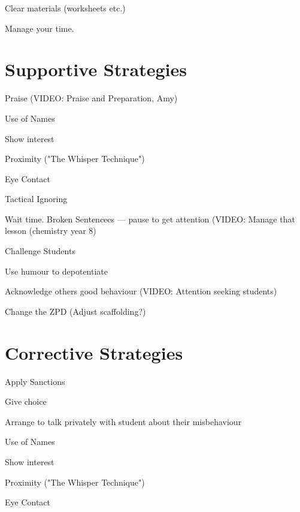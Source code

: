 \documentclass{report}
\begin{document}
Clear materials (worksheets etc.)

Manage your time.




\chapter{Supportive Strategies}

Praise (VIDEO: Praise and Preparation, Amy)

Use of Names

Show interest

Proximity ("The Whisper Technique")

Eye Contact

Tactical Ignoring

Wait time.
Broken Sentencees --- pause to get attention (VIDEO: Manage that lesson (chemistry year 8)

Challenge Students

Use humour to depotentiate

Acknowledge others good behaviour
(VIDEO: Attention seeking students)

Change the ZPD (Adjust scaffolding?)

\chapter{Corrective Strategies}

Apply Sanctions

Give choice

Arrange to talk privately with student about their misbehaviour

Use of Names

Show interest

Proximity ("The Whisper Technique")

Eye Contact
\end{document}
